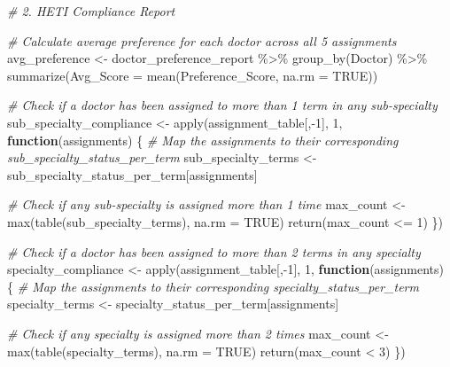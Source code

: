 \documentclass[
]{article}
\newenvironment{Shaded}{\begin{snugshade}}{\end{snugshade}}
\newcommand{\AttributeTok}[1]{\textcolor[rgb]{0.77,0.63,0.00}{#1}}
\newcommand{\CommentTok}[1]{\textcolor[rgb]{0.56,0.35,0.01}{\textit{#1}}}
\newcommand{\ConstantTok}[1]{\textcolor[rgb]{0.00,0.00,0.00}{#1}}
\newcommand{\ControlFlowTok}[1]{\textcolor[rgb]{0.13,0.29,0.53}{\textbf{#1}}}
\newcommand{\DecValTok}[1]{\textcolor[rgb]{0.00,0.00,0.81}{#1}}
\newcommand{\FunctionTok}[1]{\textcolor[rgb]{0.00,0.00,0.00}{#1}}
\newcommand{\NormalTok}[1]{#1}
\newcommand{\OtherTok}[1]{\textcolor[rgb]{0.56,0.35,0.01}{#1}}
\newcommand{\SpecialCharTok}[1]{\textcolor[rgb]{0.00,0.00,0.00}{#1}}
\begin{document}
\begin{Shaded}
\begin{Highlighting}[]
\CommentTok{\# 2. HETI Compliance Report}


\CommentTok{\# Calculate average preference for each doctor across all 5 assignments}
\NormalTok{avg\_preference }\OtherTok{\textless{}{-}}\NormalTok{ doctor\_preference\_report }\SpecialCharTok{\%\textgreater{}\%}
  \FunctionTok{group\_by}\NormalTok{(Doctor) }\SpecialCharTok{\%\textgreater{}\%}
  \FunctionTok{summarize}\NormalTok{(}\AttributeTok{Avg\_Score =} \FunctionTok{mean}\NormalTok{(Preference\_Score, }\AttributeTok{na.rm =} \ConstantTok{TRUE}\NormalTok{))}

\CommentTok{\# Check if a doctor has been assigned to more than 1 term in any sub{-}specialty}
\NormalTok{sub\_specialty\_compliance }\OtherTok{\textless{}{-}} \FunctionTok{apply}\NormalTok{(assignment\_table[,}\SpecialCharTok{{-}}\DecValTok{1}\NormalTok{], }\DecValTok{1}\NormalTok{, }\ControlFlowTok{function}\NormalTok{(assignments) \{}
  \CommentTok{\# Map the assignments to their corresponding sub\_specialty\_status\_per\_term}
\NormalTok{  sub\_specialty\_terms }\OtherTok{\textless{}{-}}\NormalTok{ sub\_specialty\_status\_per\_term[assignments]}
  
  \CommentTok{\# Check if any sub{-}specialty is assigned more than 1 time}
\NormalTok{  max\_count }\OtherTok{\textless{}{-}} \FunctionTok{max}\NormalTok{(}\FunctionTok{table}\NormalTok{(sub\_specialty\_terms), }\AttributeTok{na.rm =} \ConstantTok{TRUE}\NormalTok{)}
  \FunctionTok{return}\NormalTok{(max\_count }\SpecialCharTok{\textless{}=} \DecValTok{1}\NormalTok{)}
\NormalTok{\})}

\CommentTok{\# Check if a doctor has been assigned to more than 2 terms in any specialty}
\NormalTok{specialty\_compliance }\OtherTok{\textless{}{-}} \FunctionTok{apply}\NormalTok{(assignment\_table[,}\SpecialCharTok{{-}}\DecValTok{1}\NormalTok{], }\DecValTok{1}\NormalTok{, }\ControlFlowTok{function}\NormalTok{(assignments) \{}
  \CommentTok{\# Map the assignments to their corresponding specialty\_status\_per\_term}
\NormalTok{  specialty\_terms }\OtherTok{\textless{}{-}}\NormalTok{ specialty\_status\_per\_term[assignments]}
  
  \CommentTok{\# Check if any specialty is assigned more than 2 times}
\NormalTok{  max\_count }\OtherTok{\textless{}{-}} \FunctionTok{max}\NormalTok{(}\FunctionTok{table}\NormalTok{(specialty\_terms), }\AttributeTok{na.rm =} \ConstantTok{TRUE}\NormalTok{)}
  \FunctionTok{return}\NormalTok{(max\_count }\SpecialCharTok{\textless{}} \DecValTok{3}\NormalTok{)}
\NormalTok{\})}


\end{Highlighting}
\end{Shaded}
\end{document}
